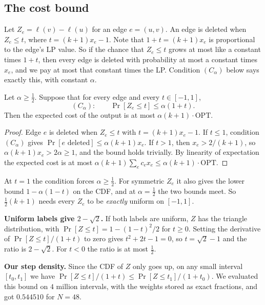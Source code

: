 \documentclass[sigconf,nonacm]{acmart}
\begin{document}
\subsection{The cost bound}
Let $Z_e=\ell(v)-\ell(u)$ for an edge $e=(u,v)$. An edge is deleted when $Z_e\le t$, where $t=(k+1)x_e-1$. Note that $1+t=(k+1)x_e$ is proportional to the edge's LP value. So if the chance that $Z_e\le t$ grows at most like a constant times $1+t$, then every edge is deleted with probability at most a constant times $x_e$, and we pay at most that constant times the LP. Condition $(C_\alpha)$ below says exactly this, with constant $\alpha$.
\begin{lemma}\label{lem:cost}
Let $\alpha\ge\frac12$. Suppose that for every edge and every $t\in[-1,1]$,
\[(C_\alpha):\qquad\Pr[Z_e\le t]\le\alpha(1+t).\]
Then the expected cost of the output is at most $\alpha(k+1)\cdot\mathrm{OPT}$.
\end{lemma}
\begin{proof}
Edge $e$ is deleted when $Z_e\le t$ with $t=(k+1)x_e-1$. If $t\le1$, condition $(C_\alpha)$ gives $\Pr[e\text{ deleted}]\le\alpha(k+1)x_e$. If $t>1$, then $x_e>2/(k+1)$, so $\alpha(k+1)x_e>2\alpha\ge1$, and the bound holds trivially. By linearity of expectation the expected cost is at most $\alpha(k+1)\sum_ec_ex_e\le\alpha(k+1)\cdot\mathrm{OPT}$.
\end{proof}

At $t=1$ the condition forces $\alpha\ge\frac12$. For symmetric $Z_e$ it also gives the lower bound $1-\alpha(1-t)$ on the CDF, and at $\alpha=\frac12$ the two bounds meet. So $\frac12(k+1)$ needs every $Z_e$ to be \emph{exactly} uniform on $[-1,1]$.

\textbf{Uniform labels give $2-\sqrt2$.} If both labels are uniform, $Z$ has the triangle distribution, with $\Pr[Z\le t]=1-(1-t)^2/2$ for $t\ge0$. Setting the derivative of $\Pr[Z\le t]/(1+t)$ to zero gives $t^2+2t-1=0$, so $t=\sqrt2-1$ and the ratio is $2-\sqrt2$. For $t<0$ the ratio is at most $\frac12$.

\textbf{Our step density.} Since the CDF of $Z$ only goes up, on any small interval $[t_0,t_1]$ we have $\Pr[Z\le t]/(1+t)\le\Pr[Z\le t_1]/(1+t_0)$. We evaluated this bound on $4$ million intervals, with the weights stored as exact fractions, and got $0.544510$ for $N=48$.
\end{document}
